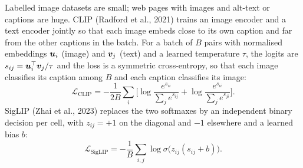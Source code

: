Labelled image datasets are small; web pages with images and alt-text or captions are huge.
CLIP (Radford et al., 2021) trains an image encoder and a text encoder jointly so that each image
embeds close to its own caption and far from the other captions in the batch. For a batch of
$B$ pairs with normalised embeddings $\bm{u}_i$ (image) and $\bm{v}_j$ (text) and a learned
temperature $\tau$, the logits are $s_{ij}=\bm{u}_i^\top\bm{v}_j/\tau$ and the loss is a
symmetric cross-entropy, so that each image classifies its caption among $B$ and each caption classifies its image:
\begin{equation}
  \mathcal{L}_{\text{CLIP}} = -\frac{1}{2B}\sum_{i}\Big[\log\frac{e^{s_{ii}}}{\sum_j e^{s_{ij}}}
     + \log\frac{e^{s_{ii}}}{\sum_j e^{s_{ji}}}\Big].
\end{equation}
SigLIP (Zhai et al., 2023) replaces the two softmaxes by an independent binary decision per
cell, with $z_{ij}=+1$ on the diagonal and $-1$ elsewhere and a learned bias $b$:
\begin{equation}
  \mathcal{L}_{\text{SigLIP}} = -\frac{1}{B}\sum_{i,j}\log\sigma\big(z_{ij}(s_{ij}+b)\big).
\end{equation}

